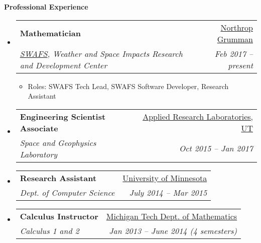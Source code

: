 \documentclass[letterpaper,11pt]{article}
\makeatletter
\newcommand{\resitem}[1]{\item #1 \vspace{-2pt}}
\newcommand{\resheading}[1]{{\large \textbf{#1}}}
\newcommand{\ressubheading}[4]{
\begin{tabular*}{6.5in}{l@{\extracolsep{\fill}}r}
		\textbf{#1} & #2 \\
		\textit{#3} & \textit{#4} \\
\end{tabular*}\vspace{-6pt}}
\makeatother
\begin{document}
\resheading{Professional Experience}
\begin{itemize}
\item%
  \ressubheading{Mathematician}{\href{https://www.northropgrumman.com}{Northrop Grumman}}{
      \href{http://www.northropgrumman.com/Capabilities/SpaceWeatherAnalysis/Pages/default.aspx}{SWAFS},
        Weather and Space Impacts Research and Development Center}{Feb 2017 -- present}
  {\footnotesize
  \begin{itemize}  
    \resitem{Roles: SWAFS Tech Lead, SWAFS Software Developer, Research Assistant}
  \end{itemize}
  }
\item%
  \ressubheading{Engineering Scientist Associate}{\href{https://www.arlut.utexas.edu}{Applied Research Laboratories, UT}}{Space and Geophysics Laboratory}{Oct 2015 -- Jan 2017}
  {\footnotesize
  }
\item
  \ressubheading{Research Assistant}{\href{https://www.cs.umn.edu}{University of Minnesota}}{Dept. of Computer Science}{July 2014 -- Mar 2015}
\item%
  \ressubheading{Calculus Instructor}{\href{www.mtu.edu/math/}{Michigan Tech Dept. of Mathematics}}{Calculus 1 and 2}{Jan 2013 -- June 2014 (4 semesters)}
\begin{comment}
\item%
  \ressubheading{Lab TA}{\href{www.mtu.edu/physics}{Michigan Tech}}{Introductory Mechanics, Electronics, Mathematica}{Aug 2009 -- Apr 2012}
	{\footnotesize
	\begin{itemize}
		\resitem{Responsibilities: grade labs; lead lab sections; assist students with Mathematica}
		\resitem{Mathlab (Aug 2009 - Apr 2011), Mechanics (Aug 2010 - Dec 2011), Electronics (Jan 2012 - May 2012)}
	\end{itemize}
	}
\item%
  \ressubheading{MathLab Lab Consultant}{\href{www.mtu.edu/math/}{Michigan Tech Dept. of Mathematical Sciences}}{Calculus 1,2, and 3}{Jan 2009 -- Apr 2011}
	{\footnotesize
	\begin{itemize}
		\resitem{8 to 15 hours per week}
	\end{itemize}
	}
\end{comment}
\end{itemize}
\end{document}
